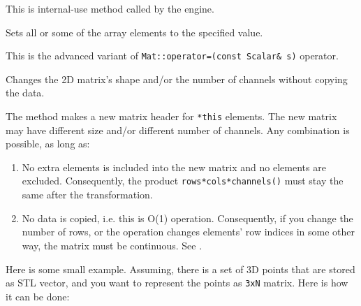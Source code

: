 \begin{description}
\end{description}

This is internal-use method called by the  engine.

Sets all or some of the array elements to the specified value.

\begin{description}
\end{description}

This is the advanced variant of \texttt{Mat::operator=(const Scalar\& s)} operator.

Changes the 2D matrix's shape and/or the number of channels without copying the data.


\begin{description}
\end{description}

The method makes a new matrix header for \texttt{*this} elements. The new matrix may have different size and/or different number of channels. Any combination is possible, as long as:
\begin{enumerate}
\item No extra elements is included into the new matrix and no elements are excluded. Consequently,
     the product \texttt{rows*cols*channels()} must stay the same after the transformation.
\item No data is copied, i.e. this is O(1) operation. Consequently, if you change the number of rows, or the operation changes elements' row indices in some other way, the matrix must be continuous. See .
\end{enumerate}

Here is some small example. Assuming, there is a set of 3D points that are stored as STL vector, and you want to represent the points as \texttt{3xN} matrix. Here is how it can be done:

